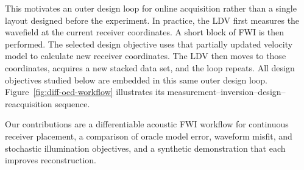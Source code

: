 This motivates an outer design loop for online acquisition rather than a
single layout designed before the experiment. In practice, the LDV
first measures the wavefield at the current receiver coordinates. A short block of FWI is then performed. The selected design objective uses that partially
updated velocity model to calculate new receiver coordinates. The LDV then moves to
those coordinates, acquires a new stacked data set, and the loop repeats. All
design objectives studied below are embedded in this same outer design loop.
Figure~\ref{fig:diff-oed-workflow} illustrates its
measurement--inversion--design--reacquisition sequence.


Our contributions are a differentiable acoustic FWI workflow for continuous
receiver placement, a comparison of oracle model error, waveform misfit, and stochastic
illumination objectives, and a synthetic demonstration that each improves
reconstruction.

